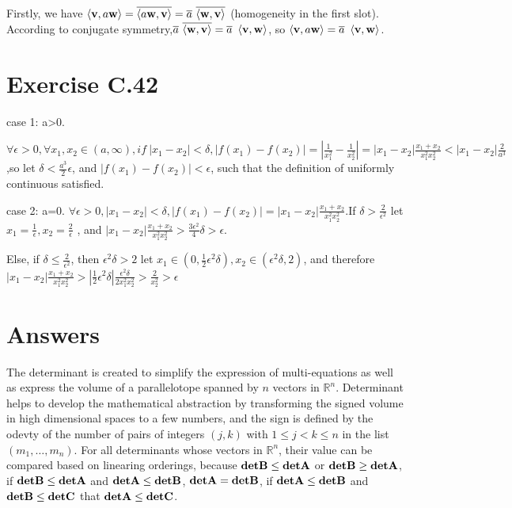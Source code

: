 \documentclass{article}
\begin{document}
\begin{spacing}{1.0}
    \subsection{}
    Firstly, we have $\left\langle{ {\bf{v}},a\bf{w} }\right\rangle = \overline{\left\langle{ a\bf{w},\bf{v} }\right\rangle} = \overline{a} \ \overline{\left\langle{ \bf{w},\bf{v} }\right\rangle}$
    (homogeneity in the first slot).
    According to conjugate symmetry,$\overline{a} \ \overline{\left\langle{ \bf{w},\bf{v} }\right\rangle} = \overline{a} \ \left\langle{ \bf{v},\bf{w} }\right\rangle$,
    so $\left\langle{ {\bf{v}},a\bf{w} }\right\rangle = \overline{a} \ \left\langle{ \bf{v},\bf{w} }\right\rangle$.
    \section{Exercise C.42}
    case 1: a>0.

    $\forall \epsilon > 0,\forall x_1,x_2 \in (a,\infty),if \ |x_1 - x_2| < \delta, |f(x_1) - f(x_2)| = |\frac{1}{x_1^2}- \frac{1}{x_2^2}| = |x_1 - x_2|\frac{x_1+x_2}{x_1^2x_2^2} < |x_1 - x_2|\frac{2}{a^3}$,so let $\delta < \frac{a^3}{2} \epsilon$,
    and $|f(x_1) - f(x_2)| < \epsilon$, such that the definition of uniformly continuous satisfied.

    case 2: a=0.
    $\forall \epsilon > 0,|x_1 - x_2| < \delta,|f(x_1) - f(x_2)| = |x_1 - x_2|\frac{x_1+x_2}{x_1^2x_2^2}$.If $\delta > \frac{2}{\epsilon^2}$ let $x_1 = \frac{1}{\epsilon}, x_2 = \frac{2}{\epsilon}$
    , and $|x_1 - x_2|\frac{x_1+x_2}{x_1^2x_2^2} > \frac{3\epsilon^2}{4} \delta > \epsilon$. 
    
    Else, if $\delta \leq \frac{2}{\epsilon^2}$, then $\epsilon^2\delta > 2$
    let $x_1 \in (0, \frac{1}{2}\epsilon^2 \delta), x_2 \in (\epsilon^2\delta,2)$, and therefore $|x_1 - x_2|\frac{x_1+x_2}{x_1^2x_2^2} > |\frac{1}{2}\epsilon^2\delta| \frac{\epsilon^2\delta}{2x_1^2x_2^2} > \frac{2}{x_2^2}>\epsilon$

    \section{Answers}
        The determinant is created to simplify the expression of multi-equations as well as express the volume of a parallelotope spanned by $n$ vectors in $\mathbb{R}^n$.
        Determinant helps to develop the mathematical abstraction by transforming the signed volume in high dimensional spaces to a few numbers, and the sign is defined by the odevty of the number of pairs
         of integers $(j,k)$ with $1\leq j<k\leq n$ in the list$(m_1,\dots, m_n)$. For all determinants whose vectors in $\mathbb{R}^n$, 
         their value can be compared based on linearing orderings, because $\bf{det}B \leq \bf{det}A$ or $\bf{det}B \geq \bf{det}A$, if $\bf{det}B \leq \bf{det}A$ and $\bf{det}A \leq \bf{det}B$,
         $\bf{det}A = \bf{det}B$, if $\bf{det}A \leq \bf{det}B$ and $\bf{det}B \leq \bf{det}C$ that $\bf{det}A \leq \bf{det}C$.

    
\end{spacing}
    
\end{document}
